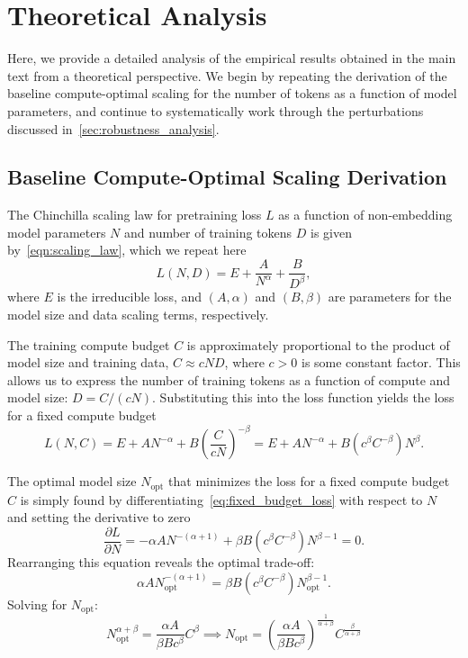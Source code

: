 \section{Theoretical Analysis}
\label{app:theoretical_analysis}

Here, we provide a detailed analysis of the empirical results obtained in the main text from a theoretical perspective. We begin by repeating the derivation of the baseline compute-optimal scaling for the number of tokens as a function of model parameters, and continue to systematically work through the perturbations discussed in~\cref{sec:robustness_analysis}.

\subsection{Baseline Compute-Optimal Scaling Derivation}
\label{app:theoretical_analysis:subsec:baseline}

The Chinchilla scaling law for pretraining loss $L$ as a function of non-embedding model parameters $N$ and number of training tokens $D$ is given by~\cref{eqn:scaling_law}, which we repeat here
\begin{equation}
    L(N, D) = E + \frac{A}{N^\alpha} + \frac{B}{D^\beta},
\end{equation}
where $E$ is the irreducible loss, and $(A, \alpha)$ and $(B, \beta)$ are parameters for the model size and data scaling terms, respectively.

The training compute budget $C$ is approximately proportional to the product of model size and training data, $C \approx c ND$, where $c>0$ is some constant factor. This allows us to express the number of training tokens as a function of compute and model size: $D = C / (c N)$. Substituting this into the loss function yields the loss for a fixed compute budget
\begin{equation}
\label{eq:fixed_budget_loss}
    L(N, C) = E + A N^{-\alpha} + B \left(\frac{C}{c N}\right)^{-\beta} = E + A N^{-\alpha} + B(c^\beta C^{-\beta}) N^\beta.
\end{equation}

The optimal model size $N_{\text{opt}}$ that minimizes the loss for a fixed compute budget $C$ is simply found by differentiating~\cref{eq:fixed_budget_loss} with respect to $N$ and setting the derivative to zero
\begin{equation}
    \frac{\partial L}{\partial N} = - \alpha A N^{-(\alpha+1)} + \beta B (c^\beta C^{-\beta}) N^{\beta-1} = 0.
\end{equation}
Rearranging this equation reveals the optimal trade-off:
\begin{equation}
    \alpha A N_{\text{opt}}^{-(\alpha+1)} = \beta B (c^\beta C^{-\beta}) N_{\text{opt}}^{\beta-1}.
\end{equation}
Solving for $N_{\text{opt}}$:
\begin{equation}
    N_{\text{opt}}^{\alpha+\beta} = 
    \frac{\alpha A}{\beta B c^\beta} C^\beta 
    \implies 
    N_{\text{opt}} =
    \left( \frac{\alpha A}{\beta B c^\beta} \right)^{\frac{1}{\alpha+\beta}} C^{\frac{\beta}{\alpha+\beta}}
\end{equation}

